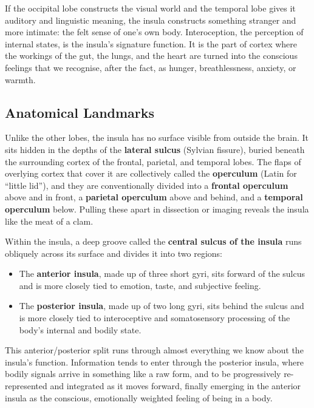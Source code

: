 \documentclass[11pt]{article}
\begin{document}
If the occipital lobe constructs the visual world and the temporal lobe gives it auditory and linguistic meaning, the insula constructs something stranger and more intimate: the felt sense of one's own body. Interoception, the perception of internal states, is the insula's signature function. It is the part of cortex where the workings of the gut, the lungs, and the heart are turned into the conscious feelings that we recognise, after the fact, as hunger, breathlessness, anxiety, or warmth.

\subsection{Anatomical Landmarks}

Unlike the other lobes, the insula has no surface visible from outside the brain. It sits hidden in the depths of the \textbf{lateral sulcus} (Sylvian fissure), buried beneath the surrounding cortex of the frontal, parietal, and temporal lobes. The flaps of overlying cortex that cover it are collectively called the \textbf{operculum} (Latin for ``little lid''), and they are conventionally divided into a \textbf{frontal operculum} above and in front, a \textbf{parietal operculum} above and behind, and a \textbf{temporal operculum} below. Pulling these apart in dissection or imaging reveals the insula like the meat of a clam.

Within the insula, a deep groove called the \textbf{central sulcus of the insula} runs obliquely across its surface and divides it into two regions:

\begin{itemize}
    \item The \textbf{anterior insula}, made up of three short gyri, sits forward of the sulcus and is more closely tied to emotion, taste, and subjective feeling.
    \item The \textbf{posterior insula}, made up of two long gyri, sits behind the sulcus and is more closely tied to interoceptive and somatosensory processing of the body's internal and bodily state.
\end{itemize}

This anterior/posterior split runs through almost everything we know about the insula's function. Information tends to enter through the posterior insula, where bodily signals arrive in something like a raw form, and to be progressively re-represented and integrated as it moves forward, finally emerging in the anterior insula as the conscious, emotionally weighted feeling of being in a body.
\end{document}
